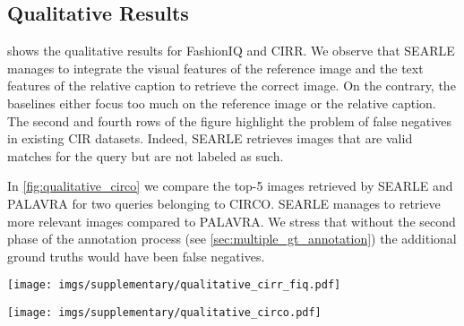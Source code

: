 \documentclass[10pt,twocolumn,letterpaper]{article}
\newcommand{\method}{SEARLE\xspace}
\begin{document}
\subsection{Qualitative Results}
 shows the qualitative results for FashionIQ and CIRR. We observe that \method manages to integrate the visual features of the reference image and the text features of the relative caption to retrieve the correct image. On the contrary, the baselines either focus too much on the reference image or the relative caption. The second and fourth rows of the figure highlight the problem of false negatives in existing CIR datasets. Indeed, \method retrieves images that are valid matches for the query but are not labeled as such.

In \cref{fig:qualitative_circo} we compare the top-5 images retrieved by \method and PALAVRA for two queries belonging to CIRCO. \method manages to retrieve more relevant images compared to PALAVRA. We stress that without the second phase of the annotation process (see \cref{sec:multiple_gt_annotation}) the additional ground truths would have been false negatives.

\begin{figure*}
    \centering
    \texttt{[image: imgs/supplementary/qualitative\_cirr\_fiq.pdf]}
    \caption{Qualitative results for the FashionIQ (top) and CIRR (bottom) datasets. For a clearer visualization, we do not consider the reference image in the retrieval results. We highlight with a green border when the retrieved image is the labeled ground truth. The second and fourth rows show examples in which \method retrieves a false negative. \vspace{15pt}}
    \label{fig:qualitative_cirr_fiq}
\end{figure*}

\begin{figure*}
    \centering
    \texttt{[image: imgs/supplementary/qualitative\_circo.pdf]}
    \caption{Qualitative results for the CIRCO dataset. We compare the top-5 retrieved images of \method and the best-performing baseline. We highlight ground truths with a green border.}
    \label{fig:qualitative_circo}
\end{figure*}
\end{document}
